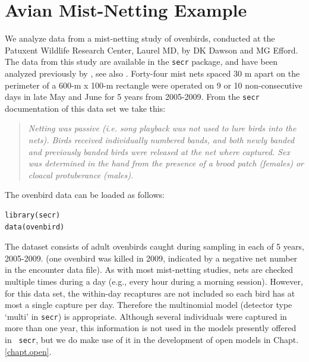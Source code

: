 \section{Avian Mist-Netting Example}
\label{poisson-mn.sec.ovenbird}

We analyze data from a mist-netting study of ovenbirds, conducted
at the 
Patuxent Wildlife Research Center, Laurel MD, by DK Dawson and MG
Efford. The data from this study are available in the \mbox{\tt secr}
package, and have been analyzed previously by
\citet{efford_etal:2004}, see also \citet{borchers_efford:2008}.
Forty-four mist nets spaced 30 m apart on the perimeter of a 600-m x
100-m rectangle
were operated on 9 or 10 non-consecutive
days in late May and June for 5 years from 2005-2009.  From the
\mbox{\tt secr} documentation of this data set we take this:
\begin{quote}
{\it
  Netting was passive (i.e. song playback was not used to lure birds
  into the nets). Birds received individually numbered bands, and both
  newly banded and previously banded birds were released at the net
  where captured. Sex was determined in the hand from the presence of
  a brood patch (females) or cloacal protuberance (males).}
\end{quote}
The ovenbird
data can be loaded as follows:
\begin{verbatim}
library(secr)
data(ovenbird)
\end{verbatim}
The dataset consists of adult ovenbirds caught during sampling in each
of 5 years, 2005-2009. (one ovenbird was killed in 2009, indicated by
a negative net number in the encounter data file).
As with most mist-netting studies, nets are checked multiple times
during a day (e.g., every hour during a morning session). However, for
this data set, the within-day recaptures are not included so each bird
has at most a single capture per day. Therefore the multinomial model
(detector type `multi' in \mbox{\tt secr}) is appropriate.
 Although
several individuals were captured in more than one year, this
information is not used in the models presently offered in \mbox{\tt
  secr}, but we do make use of it in the development of open models in
Chapt. \ref{chapt.open}.
%



